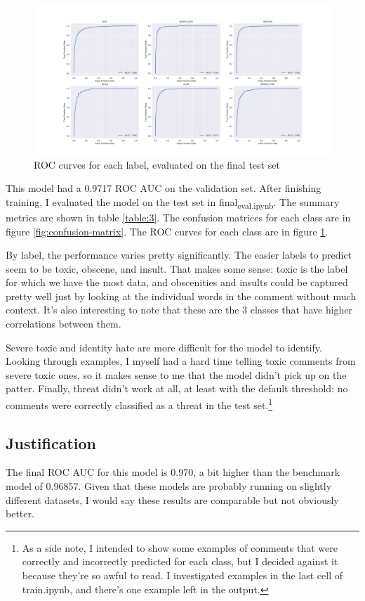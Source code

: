 \documentclass[12pt]{article}
\begin{document}
\begin{figure}
\centering
\includegraphics[width=\textwidth]{roc_curve}
\caption{ROC curves for each label, evaluated on the final test set}
\label{fig:roc-curve}
\end{figure}


This model had a 0.9717 ROC AUC on the validation set. After finishing training, I evaluated the model on the test set in final\textsubscript{eval.ipynb}. The summary metrics are shown in table \ref{table:3}. The confusion matrices for each class are in figure \ref{fig:confusion-matrix}. The ROC curves for each class are in figure \ref{fig:roc-curve}.

By label, the performance varies pretty significantly. The easier labels to predict seem to be toxic, obscene, and insult. That makes some sense: toxic is the label for which we have the most data, and obscenities and insults could be captured pretty well just by looking at the individual words in the comment without much context. It's also interesting to note that these are the 3 classes that have higher correlations between them.

Severe toxic and identity hate are more difficult for the model to identify. Looking through examples, I myself had a hard time telling toxic comments from severe toxic ones, so it makes sense to me that the model didn't pick up on the patter. Finally, threat didn't work at all, at least with the default threshold: no comments were correctly classified as a threat in the test set.\footnote{As a side note, I intended to show some examples of comments that were correctly and incorrectly predicted for each class, but I decided against it because they're so awful to read. I investigated examples in the last cell of train.ipynb, and there's one example left in the output.}
\subsection*{Justification}
\label{sec:org2edc244}
The final ROC AUC for this model is 0.970, a bit higher than the benchmark model of 0.96857. Given that these models are probably running on slightly different datasets, I would say these results are comparable but not obviously better.
\end{document}
